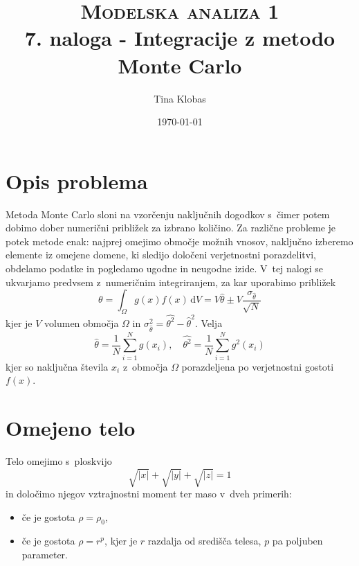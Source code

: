 \documentclass[a4paper,pdftex,10pt]{article}
\title{	
\normalfont \normalsize 
\textsc{Modelska analiza 1} \\ [25pt] %
\huge 7. naloga - Integracije z metodo Monte Carlo\\ %
}
\author{Tina Klobas} %
\date{\normalsize\today} %
\numberwithin{figure}{section} %
\begin{document}
\maketitle %

\section{Opis problema}
Metoda Monte Carlo sloni na vzorčenju naključnih dogodkov s~čimer potem dobimo 
dober numerični približek za izbrano količino. Za različne probleme je potek metode
enak: najprej omejimo območje možnih vnosov, naključno izberemo elemente iz omejene domene,
ki sledijo določeni verjetnostni porazdelitvi, obdelamo podatke in pogledamo ugodne
in neugodne izide. V~tej nalogi se ukvarjamo predvsem z~numeričnim integriranjem, za kar
uporabimo približek
\begin{equation} \label{Monte}
    \theta = \int_{\Omega} \!g(x) f(x) \,\text{d}V = V \hat{\theta}
    \pm V \frac{ \sigma_{\hat{\theta}} }{\sqrt{N}} 
\end{equation}
kjer je $V$ volumen območja $\Omega$ in $\sigma_{\hat{\theta}}^2 = 
\hat{\theta^2} - \hat{\theta}^2 $. Velja 
\begin{equation} \label{Carlo}
    \hat{\theta} = \frac{1}{N} \sum_{i=1}^N g(x_i), \quad
    \hat{\theta^2} = \frac{1}{N} \sum_{i=1}^N g^2(x_i)
\end{equation}
kjer so naključna števila $x_i$ z~območja $\Omega$ porazdeljena po verjetnostni gostoti
$f(x)$.
\pagebreak
\section{Omejeno telo}
Telo omejimo s~ploskvijo
\begin{equation}
    \sqrt{|x|} + \sqrt{|y|} + \sqrt{|z|} = 1
\end{equation}
in določimo njegov vztrajnostni moment ter maso v~dveh primerih:
\begin{itemize}
    \item če je gostota $\rho = \rho_0$,
    \item če je gostota $\rho = r^p $, kjer je $r$ razdalja od središča telesa,
	$p$ pa poljuben parameter.
\end{itemize}
\end{document}
